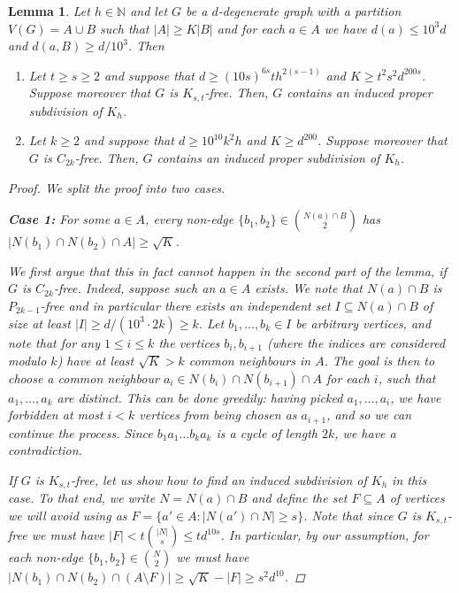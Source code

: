 \documentclass[10pt, a4paper]{article}
\numberwithin{theorem}{section} %
\newtheorem{lemma}[theorem]{Lemma}
\theoremstyle{remark}
\theoremstyle{definition}
\begin{document}
\begin{lemma}\label{lemma:lopsided_case}
    Let $h \in \mathbb{N}$ and let $G$ be a $d$-degenerate graph with a partition $V(G) = A \cup B$ such that $|A| \geq K|B|$ and for each $a \in A$ we have $d(a) \leq 10^3d$ and $d(a, B) \geq d/10^3$.
    Then
    \begin{enumerate}
        \item Let $t \geq s \geq 2$ and suppose that $d \geq (10s)^{6s}th^{2(s-1)}$ and $K \geq t^2s^2d^{200s}$.
        Suppose moreover that $G$ is $K_{s, t}$-free.
        Then, $G$ contains an induced proper subdivision of $K_h$.
        \item Let $k \geq 2$ and suppose that $d \geq 10^{10}k^2h$ and $K \geq d^{200}$.
        Suppose moreover that $G$ is $C_{2k}$-free.
        Then, $G$ contains an induced proper subdivision of $K_h$.
    \end{enumerate}
    \begin{proof}
        We split the proof into two cases.

        \medskip
        \noindent
        \textbf{Case 1:} For some $a \in A$, every non-edge $\{b_1, b_2\} \in \binom{N(a) \cap B}{2}$ has $|N(b_1) \cap N(b_2) \cap A| \geq \sqrt{K}$.

        We first argue that this in fact cannot happen in the second part of the lemma, if $G$ is $C_{2k}$-free.
        Indeed, suppose such an $a \in A$ exists.
        We note that $N(a) \cap B$ is $P_{2k-1}$-free and in particular there exists an independent set $I \subseteq N(a) \cap B$ of size at least $|I| \geq d/(10^3\cdot2k) \geq k$. Let $b_1, \dots, b_k\in I$ be arbitrary vertices, and note that for any $1\leq i\leq k$ the vertices $b_i, b_{i+1}$ (where the indices are considered modulo $k$) have at least $\sqrt{K}>k$ common neighbours in $A$. The goal is then to choose a common neighbour $a_i\in N(b_i)\cap N(b_{i+1})\cap A$ for each $i$, such that $a_1, \dots, a_k$ are distinct. This can be done greedily: having picked $a_1, \dots, a_i$, we have forbidden at most $i<k$ vertices from being chosen as $a_{i+1}$, and so we can continue the process. Since $b_1a_1\dots b_ka_k$ is a cycle of length $2k$, we have a contradiction.

        If $G$ is $K_{s, t}$-free, let us show how to find an induced subdivision of $K_h$ in this case.
        To that end, we write $N = N(a) \cap B$ and define the set $F\subseteq A$ of vertices we will avoid using as $F = \{ a' \in A : |N(a') \cap N| \geq s \}$.
        Note that since $G$ is $K_{s, t}$-free we must have $|F| < t\binom{|N|}{s} \leq td^{10s}$.
        In particular, by our assumption, for each non-edge $\{b_1, b_2\} \in \binom{N}{2}$ we must have $|N(b_1) \cap N(b_2) \cap (A\setminus F)| \geq \sqrt{K} - |F| \geq s^2d^{10}$.


\end{proof}
\end{lemma}
\end{document}
